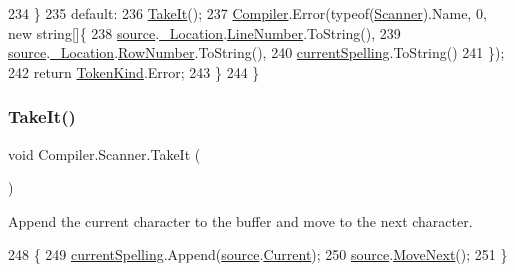 \begin{DoxyCode}
234                             \}
235                         \textcolor{keywordflow}{default}:
236                             \mbox{\hyperlink{class_compiler_1_1_scanner_af112ca8e7a48e769ab142b1fbb4d8802}{TakeIt}}();
237                             \mbox{\hyperlink{namespace_compiler}{Compiler}}.Error(typeof(\mbox{\hyperlink{class_compiler_1_1_scanner_a1b80cbd150fb8fdb87f6b31c9d2ddc48}{Scanner}}).Name, 0, \textcolor{keyword}{new} \textcolor{keywordtype}{string}[]\{
238                                 \mbox{\hyperlink{class_compiler_1_1_scanner_a6fa17eef62c3cf43853464ccfbd61966}{source}}.\mbox{\hyperlink{class_compiler_1_1_source_file_a9f6feacf9e20b5b1d535c712d9b4370e}{\_Location}}.\mbox{\hyperlink{class_compiler_1_1_location_a71feb3bfd70af6096dc48451765ba284}{LineNumber}}.ToString(),
239                                 \mbox{\hyperlink{class_compiler_1_1_scanner_a6fa17eef62c3cf43853464ccfbd61966}{source}}.\mbox{\hyperlink{class_compiler_1_1_source_file_a9f6feacf9e20b5b1d535c712d9b4370e}{\_Location}}.\mbox{\hyperlink{class_compiler_1_1_location_a766213e18168dcb22d657bee4f047ed9}{RowNumber}}.ToString(),
240                                 \mbox{\hyperlink{class_compiler_1_1_scanner_a3bea5b7c795b6ecfff02cf15f197e277}{currentSpelling}}.ToString()
241                             \});
242                             \textcolor{keywordflow}{return} \mbox{\hyperlink{namespace_compiler_a57929962f25004759596fc3f13cf563c}{TokenKind}}.Error;
243                     \}
244                 \}
\end{DoxyCode}
\mbox{\label{class_compiler_1_1_scanner_af112ca8e7a48e769ab142b1fbb4d8802}} 
\subsubsection{\texorpdfstring{Take\+It()}{TakeIt()}}
{\footnotesize\ttfamily void Compiler.\+Scanner.\+Take\+It (\begin{DoxyParamCaption}{ }\end{DoxyParamCaption})\hspace{0.3cm}{\ttfamily [private]}}

Append the current character to the buffer and move to the next character. 
\begin{DoxyCode}
248                                       \{
249                     \mbox{\hyperlink{class_compiler_1_1_scanner_a3bea5b7c795b6ecfff02cf15f197e277}{currentSpelling}}.Append(\mbox{\hyperlink{class_compiler_1_1_scanner_a6fa17eef62c3cf43853464ccfbd61966}{source}}.\mbox{\hyperlink{class_compiler_1_1_source_file_a4a0d8f66b3c7de70edadb1761aaf65b5}{Current}});
250                     \mbox{\hyperlink{class_compiler_1_1_scanner_a6fa17eef62c3cf43853464ccfbd61966}{source}}.\mbox{\hyperlink{class_compiler_1_1_source_file_ad80d0f3a9ead18dce6baad58971838bb}{MoveNext}}();
251                 \}
\end{DoxyCode}


